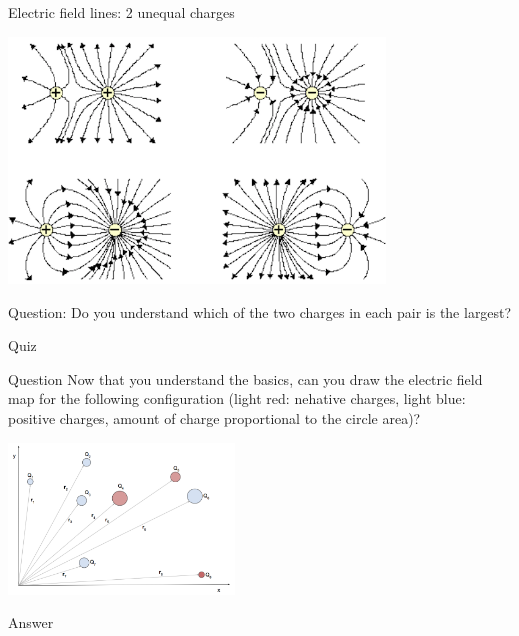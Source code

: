 %
%

\begin{frame}{Electric field lines: 2 unequal charges}

\begin{center}
 \includegraphics[width=0.75\textwidth]{./images/schematics/electric_field_lines_2_unequal_charges.png}
\end{center}

{\small
Question: Do you understand which of the two charges in each pair is the largest?
}

\end{frame}


%
%

{
\problemslide

\begin{frame}{Quiz}

\begin{blockexmplque}{Question}
   Now that you understand the basics, can you draw the electric field map for the following configuration
   (light red: nehative charges, light blue: positive charges, amount of charge proportional to the circle area)?
   \vspace{0.3cm}
   \begin{center}
     \includegraphics[width=0.45\textwidth]{./images/problems/lect01_n_charges.png}\\
   \end{center}
\end{blockexmplque}

\begin{blockexmplans}{Answer}
\noindent
\end{blockexmplans}

\end{frame}

} %


